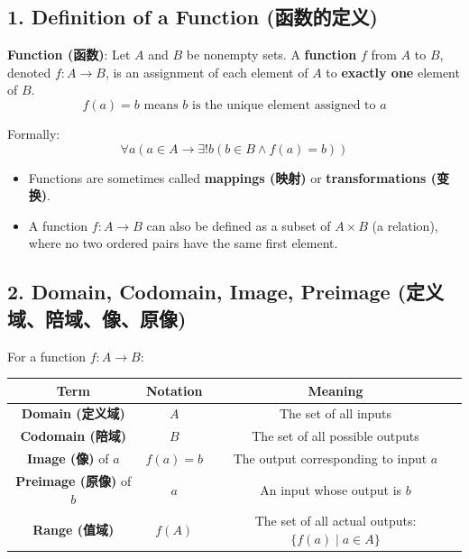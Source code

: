 \documentclass[10pt,a4paper,openany]{ctexbook}
\theoremstyle{definition}
\theoremstyle{remark}
\begin{document}
\vspace{-2pt}

\subsection{1. Definition of a Function (函数的定义)}

\textbf{Function (函数)}: Let $A$ and $B$ be nonempty sets. A \textbf{function} $f$ from $A$ to $B$, denoted $f: A \to B$, is an assignment of each element of $A$ to \textbf{exactly one} element of $B$.
\[
f(a) = b \text{ means } b \text{ is the unique element assigned to } a
\]

Formally:
\[
\forall a (a \in A \to \exists! b (b \in B \land f(a) = b))
\]

\begin{itemize}
\item Functions are sometimes called \textbf{mappings (映射)} or \textbf{transformations (变换)}.
\item A function $f: A \to B$ can also be defined as a subset of $A \times B$ (a relation), where no two ordered pairs have the same first element.

\end{itemize}

\vspace{-2pt}

\subsection{2. Domain, Codomain, Image, Preimage (定义域、陪域、像、原像)}

For a function $f: A \to B$:
\begin{center}
\begin{tabular}{ccc}
\hline
Term & Notation & Meaning \\ \hline
\textbf{Domain (定义域)} & $A$ & The set of all inputs \\
\textbf{Codomain (陪域)} & $B$ & The set of all possible outputs \\
\textbf{Image (像)} of $a$ & $f(a)=b$ & The output corresponding to input $a$ \\
\textbf{Preimage (原像)} of $b$ & $a$ & An input whose output is $b$ \\
\textbf{Range (值域)} & $f(A)$ & The set of all actual outputs: $\{f(a) \mid a \in A\}$ \\
\hline
\end{tabular}

\end{center}
\end{document}
